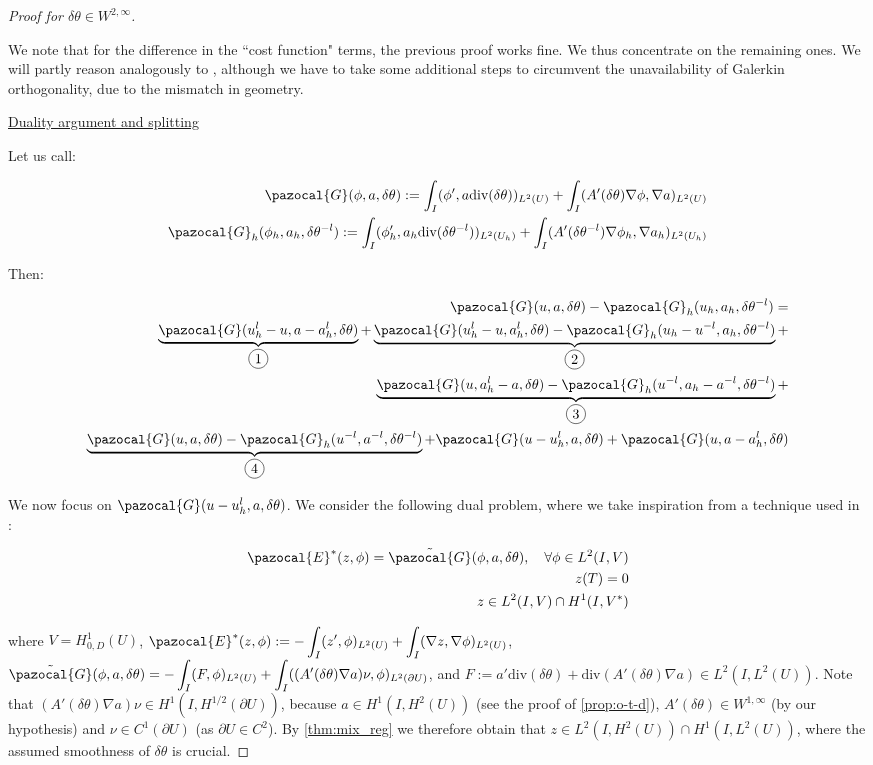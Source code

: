 \documentclass[english,a4paper,10pt,oneside]{scrbook}	%
\theoremstyle{break}
\newenvironment{mproof}[1][\proofname]{%
  \begin{proof}[#1]$ $\par\nobreak\ignorespaces
}{%
  \end{proof}
}
\renewcommand*{\proofname}{Proof}
\theoremstyle{remark}
\newcommand{\ds}{\displaystyle}
\newcommand{\te}{\theta}
\newcommand{\dive}{\text{div}}
\newcommand*\circled[1]{\tikz[baseline=(char.base)]{
            \node[shape=circle,draw,inner sep=2pt] (char) {#1};}}
\newcommand{\mE}{\pazocal{E}}
\newcommand{\mG}{\pazocal{G}}
\begin{document}
\begin{mproof}[Proof for $\delta \te \in W^{2,\infty}$]

We note that for the difference in the ``cost function" terms, the previous proof works fine. We thus concentrate on the remaining ones. We will partly reason analogously to \cite{paganini}, although we have to take some additional steps to circumvent the unavailability of Galerkin orthogonality, due to the mismatch in geometry.

\underline{Duality argument and splitting}

Let us call: 

\begin{align*}
\mG(\phi,a, \delta \te):=\ds \int_I(\phi',a\dive(\delta \te))_{L^2(U)} + \int_I (A'(\delta\te )\nabla \phi, \nabla a)_{L^2(U)}\\
\mG_h(\phi_h,a_h, \delta \te^{-l}):=\ds \int_I (\phi_h',a_h\dive(\delta \te^{-l}))_{L^2(U_h)} + \int_I (A'(\delta \te^{-l})\nabla \phi_h, \nabla a_h)_{L^2(U_h)}
\end{align*}

Then:

\begin{align*}
	\mG(u,a, \delta \te) - \mG_h(u_h,a_h, \delta \te^{-l}) =\\
	\underbrace{\mG(u_h^l-u, a-a_h^l, \delta \te)}_{\circled{1}}+
	\underbrace{\mG(u_h^l-u,a_h^l, \delta \te) - \mG_h(u_h-u^{-l},a_h,\delta \te^{-l})}_{\circled{2}}+\\
	\underbrace{\mG(u,a_h^l-a,\delta \te) - \mG_h(u^{-l}, a_h - a^{-l}, \delta \te^{-l})}_{\circled{3}}+\\
	\underbrace{\mG(u,a,\delta \te) - \mG_h(u^{-l},a^{-l},\delta \te^{-l})}_{\circled{4}} +
	\mG(u-u_h^l, a, \delta \te)+	\mG(u, a-a_h^l,\delta \te)
\end{align*}

We now focus on $\mG(u-u_h^l, a, \delta \te)$. We consider the following dual problem, where we take inspiration from a technique used in \cite{paganini}:

\begin{align}
\label{eqn:dual_problem}
	\mE^*(z,\phi) = \tilde{\mG}(\phi, a, \delta \te), \quad \forall \phi \in L^2(I,V)\\
	z(T) = 0 \\
	z \in L^2(I,V)\cap H^1(I,V^*)
\end{align}

where $V = H^1_{0,D}(U)$, $\mE^*(z,\phi) := -\ds \int_I(z',\phi)_{L^2(U)} + \int_I (\nabla z, \nabla \phi)_{L^2(U)}$, $\tilde{\mG}(\phi, a, \delta \te) =  \ds -\int_I(F, \phi)_{L^2(U)} + \int_I((A'(\delta \te) \nabla a)\nu, \phi)_{L^2(\partial U)}$, and $F:=a'\dive(\delta \te) + \dive(A'(\delta \te) \nabla a )\in L^2(I,L^2(U))$.
Note that $(A'(\delta \te) \nabla a)\nu \in H^1(I,H^{1/2}(\partial U))$, because $a \in H^1(I,H^2(U))$ (see the proof of \cref{prop:o-t-d}), $A'(\delta \te) \in W^{1,\infty}$ (by our hypothesis) and $\nu \in C^1(\partial U)$ (as $\partial U \in C^2$). By \cref{thm:mix_reg} we therefore obtain that $z \in L^2(I,H^2(U)) \cap H^1(I,L^2(U))$, where the assumed smoothness of $\delta \te$ is crucial.


\end{mproof}
\end{document}

